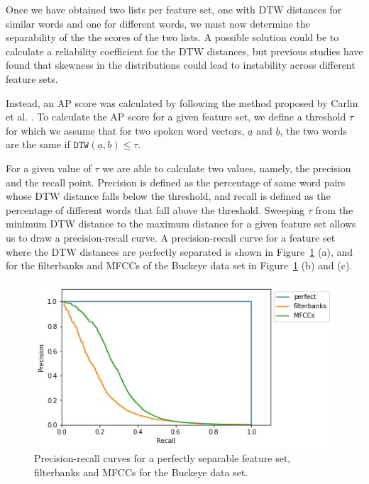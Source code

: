 Once we have obtained two lists per feature set, one with DTW distances for similar words and one for different words, we must now determine the separability of the the scores of the two lists.
A possible solution could be to calculate a reliability coefficient for the DTW distances\cite{reliability}, but previous studies have found that skewness in the distributions could lead to instability across different feature sets.
\cite{DBLP:conf/interspeech/CarlinTJH11}

Instead, an AP score was calculated by following the method proposed by Carlin et al. \cite{DBLP:conf/interspeech/CarlinTJH11}. To calculate the AP score for a given feature set, we define a threshold $\tau$ for which we assume that for two spoken word vectors, $\underline{a}$ and $\underline{b}$, the two words are the same if $\mathtt{DTW}(\underline{a}, \underline{b}) \leq \tau$. 

For a given value of $\tau$ we are able to calculate two values, namely, the precision and the recall point.
Precision is defined as the percentage of same word pairs whose DTW distance falls below the threshold, and recall is defined as the percentage of different words that fall above the threshold.
Sweeping $\tau$ from the minimum DTW distance to the maximum distance for a given feature set allows us to draw a precision-recall curve.
A precision-recall curve for a feature set where the DTW distances are perfectly separated is shown in Figure~\ref{fig:pr-curve} (a), and for the filterbanks and MFCCs of the Buckeye data set in Figure~\ref{fig:pr-curve} (b) and (c).

\begin{figure}[h]
    \centering
    \includegraphics[width=0.8\linewidth]{content/fig/pr_curve.png}
    \caption{Precision-recall curves for a perfectly separable feature set, filterbanks and MFCCs for the Buckeye data set.}
    \label{fig:pr-curve}
\end{figure}

